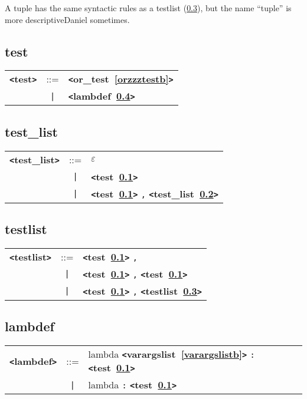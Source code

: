 \documentclass[12pt]{article}
\begin{document}
A tuple has the same syntactic rules as a testlist (\ref{testlistb}), but the name ``tuple'' is more descriptiveDaniel sometimes.

\subsection{test}
\label{testb}

\begin{tabular}{lcl}
{\bf \verb+<+test\verb+>+} & ::=  & {\bf \verb+<+or\_test~\ref{orzzztestb}\verb+>+}  \\
 & \verb+|+  & {\bf \verb+<+lambdef~\ref{lambdefb}\verb+>+}  \\
\end{tabular}

\subsection{test\_list}
\label{testzzzlistb}
\begin{tabular}{lcl}
{\bf \verb+<+test\_list\verb+>+} & ::=  & $\varepsilon$ \\
 & \verb+|+  & {\bf \verb+<+test~\ref{testb}\verb+>+}  \\
 & \verb+|+  & {\bf \verb+<+test~\ref{testb}\verb+>+}  \verb|,| {\bf \verb+<+test\_list~\ref{testzzzlistb}\verb+>+}  \\
\end{tabular}

\subsection{testlist}
\label{testlistb}
\begin{tabular}{lcl}
{\bf \verb+<+testlist\verb+>+} & ::=  & {\bf \verb+<+test~\ref{testb}\verb+>+}  \verb|,| \\
 & \verb+|+  & {\bf \verb+<+test~\ref{testb}\verb+>+}  \verb|,| {\bf \verb+<+test~\ref{testb}\verb+>+}  \\
 & \verb+|+  & {\bf \verb+<+test~\ref{testb}\verb+>+}  \verb|,| {\bf \verb+<+testlist~\ref{testlistb}\verb+>+}  \\
\end{tabular}

\subsection{lambdef}
\label{lambdefb}
\begin{tabular}{lcl}
{\bf \verb+<+lambdef\verb+>+} & ::=  & lambda {\bf \verb+<+varargslist~\ref{varargslistb}\verb+>+}  \verb|:| {\bf \verb+<+test~\ref{testb}\verb+>+}  \\
 & \verb+|+  & lambda \verb|:| {\bf \verb+<+test~\ref{testb}\verb+>+}  \\
\end{tabular}
\end{document}
